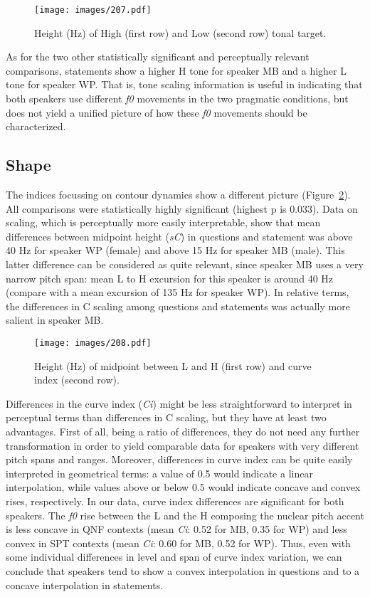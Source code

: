 \begin{figure}[p]
\centering
\texttt{[image: images/207.pdf]}
\caption{Height (Hz) of High (first row) and Low (second row) tonal target.}
\label{fig207}\end{figure}

As for the two other statistically significant and perceptually relevant comparisons, statements show a higher H tone for speaker MB and a higher L tone for speaker WP. That is, tone scaling information is useful in indicating that both speakers use different \textit{f0} movements in the two pragmatic conditions, but does not yield a unified picture of how these \textit{f0} movements should be characterized. 

\subsection{Shape}\label{sec233}
The indices focussing on contour dynamics show a different picture (Figure~\ref{fig208}). All comparisons were statistically highly significant (highest p is 0.033). Data on scaling, which is perceptually more easily interpretable, show that mean differences between midpoint height (\textit{sC}) in questions and statement was above 40 Hz for speaker WP (female) and above 15 Hz for speaker MB (male). This latter difference can be considered as quite relevant, since speaker MB uses a very narrow pitch span: mean L to H excursion for this speaker is around 40 Hz (compare with a mean excursion of 135 Hz for speaker WP). In relative terms, the differences in C scaling among questions and statements was actually more salient in speaker MB.

\begin{figure}[p]
\centering
\texttt{[image: images/208.pdf]}
\caption{Height (Hz) of midpoint between L and H (first row) and curve index (second row).}
\label{fig208}\end{figure}

Differences in the curve index (\textit{Ci}) might be less straightforward to interpret in perceptual terms than differences in C scaling, but they have at least two advantages. First of all, being a ratio of differences, they do not need any further transformation in order to yield comparable data for speakers with very different pitch spans and ranges. Moreover, differences in curve index can be quite easily interpreted in geometrical terms: a value of 0.5 would indicate a linear interpolation, while values above or below 0.5 would indicate concave and convex rises, respectively. 
In our data, curve index differences are significant for both speakers. The \textit{f0} rise between the L and the H composing the nuclear pitch accent is less concave in QNF contexts (mean \textit{Ci}: 0.52 for MB, 0.35 for WP) and less convex in SPT contexts (mean \textit{Ci}: 0.60 for MB, 0.52 for WP). Thus, even with some individual differences in level and span of curve index variation, we can conclude that speakers tend to show a convex interpolation in questions and to a concave interpolation in statements.

